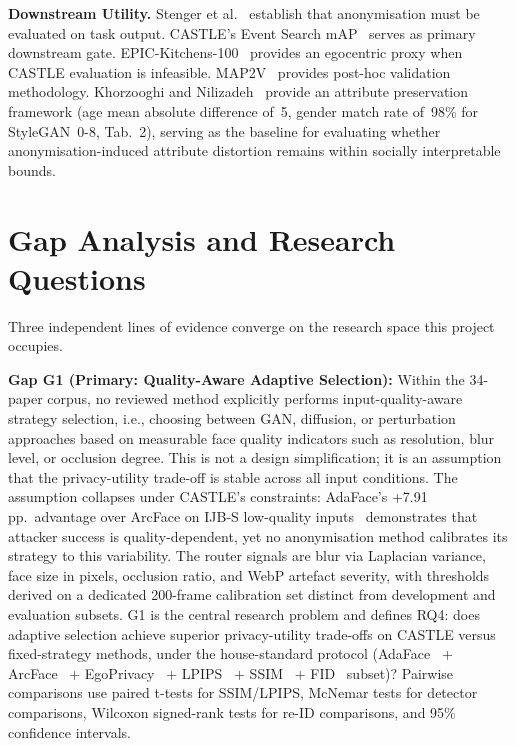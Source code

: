 \documentclass[10pt, twocolumn]{IEEEtran}
\begin{document}
\textbf{Downstream Utility.} Stenger et al.~\cite{stenger2025evaluating} establish that anonymisation must be evaluated on task output. CASTLE's Event Search mAP~\cite{rossetto2025castle} serves as primary downstream gate. EPIC-Kitchens-100~\cite{damen2022epic} provides an egocentric proxy when CASTLE evaluation is infeasible. MAP2V~\cite{zhang2024map2v} provides post-hoc validation methodology. Khorzooghi and Nilizadeh~\cite{khorzooghi2023gan} provide an attribute preservation framework (age mean absolute difference of~5, gender match rate of~98\% for StyleGAN~0-8, Tab.~2), serving as the baseline for evaluating whether anonymisation-induced attribute distortion remains within socially interpretable bounds.



\section{Gap Analysis and Research Questions}
\label{sec:gaps}

Three independent lines of evidence converge on the research space this project occupies.

\textbf{Gap G1 (Primary: Quality-Aware Adaptive Selection):} Within the 34-paper corpus, no reviewed method explicitly performs input-quality-aware strategy selection, i.e., choosing between GAN, diffusion, or perturbation approaches based on measurable face quality indicators such as resolution, blur level, or occlusion degree. This is not a design simplification; it is an assumption that the privacy-utility trade-off is stable across all input conditions. The assumption collapses under CASTLE's constraints: AdaFace's +7.91\,pp.\ advantage over ArcFace on IJB-S low-quality inputs~\cite{kim2022adaface} demonstrates that attacker success is quality-dependent, yet no anonymisation method calibrates its strategy to this variability. The router signals are blur via Laplacian variance, face size in pixels, occlusion ratio, and WebP artefact severity, with thresholds derived on a dedicated 200-frame calibration set distinct from development and evaluation subsets. G1 is the central research problem and defines RQ4: does adaptive selection achieve superior privacy-utility trade-offs on CASTLE versus fixed-strategy methods, under the house-standard protocol (AdaFace~\cite{kim2022adaface} + ArcFace~\cite{deng2019arcface} + EgoPrivacy~\cite{li2025egoprivacy} + LPIPS~\cite{zhang2018lpips} + SSIM~\cite{wang2004ssim} + FID~\cite{heusel2017fid} subset)? Pairwise comparisons use paired t-tests for SSIM/LPIPS, McNemar tests for detector comparisons, Wilcoxon signed-rank tests for re-ID comparisons, and 95\% confidence intervals.
\end{document}
